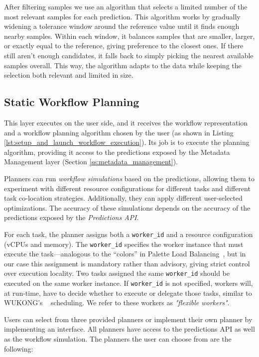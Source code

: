 \documentclass[conference]{IEEEtran}
\begin{document}
After filtering samples we use an algorithm that selects a limited number of the most relevant samples for each prediction. This algorithm works by gradually widening a tolerance window around the reference value until it finds enough nearby samples. Within each window, it balances samples that are smaller, larger, or exactly equal to the reference, giving preference to the closest ones. If there still aren't enough candidates, it falls back to simply picking the nearest available samples overall. This way, the algorithm adapts to the data while keeping the selection both relevant and limited in size.

\subsection{Static Workflow Planning}
\label{ss:static_workflow_planning}
This layer executes on the user side, and it receives the workflow representation and a workflow planning algorithm chosen by the user (as shown in Listing \ref{lst:setup_and_launch_workflow_execution}). Its job is to execute the planning algorithm, providing it access to the predictions exposed by the Metadata Management layer (Section \ref{ss:metadata_management}).

Planners can run \textit{workflow simulations} based on the predictions, allowing them to experiment with different resource configurations for different tasks and different task co-location strategies. Additionally, they can apply different user-selected optimizations. The accuracy of these simulations depends on the accuracy of the predictions exposed by the \textit{Predictions API}.

For each task, the planner assigns both a \texttt{worker\_id} and a resource configuration (vCPUs and memory). The \texttt{worker\_id} specifies the worker instance that must execute the task—analogous to the “colors” in Palette Load Balancing~\cite{palette_load_balancing}, but in our case this assignment is mandatory rather than advisory, giving strict control over execution locality. Two tasks assigned the same \texttt{worker\_id} should be executed on the same worker instance. If \texttt{worker\_id} is not specified, workers will, at run-time, have to decide whether to execute or delegate those tasks, similar to WUKONG's ~\cite{wukong_2} scheduling. We refer to these workers as \textit{"flexible workers"}.

Users can select from three provided planners or implement their own planner by implementing an interface. All planners have access to the predictions API as well as the workflow simulation. The planners the user can choose from are the following:
\end{document}
